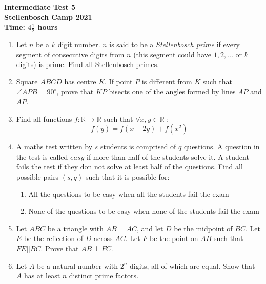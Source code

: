 \documentclass{article}
\begin{document}
\thispagestyle{empty}

\begin{center}
  \textbf{\Large Intermediate Test 5}
  \\ \vspace{1em}
  \textbf{\large Stellenbosch Camp 2021}
  \\ \vspace{1em}
  \textbf{\large Time: $4\frac{1}{2}$ hours}
\end{center}

\bigskip

\begin{enumerate}[itemsep=\fill]

\item %
Let $n$ be a $k$ digit number. $n$ is said to be a \textit{Stellenbosch prime} if every segment of consecutive digits from $n$ (this segment could have $1,2,...$ or $k$ digits) is prime. Find all Stellenbosch primes.


\item %
Square $ABCD$ has centre $K$. If point $P$ is different from $K$ such that $\angle APB = 90^{\circ}$, prove that $KP$ bisects one of the angles formed by lines $AP$ and $AP$.

\item %
Find all functions $f:\mathbb{R} \rightarrow \mathbb{R}$ such that $\forall x,y \in \mathbb{R}$ :
$$f(y) = f(x+2y) + f(x^2)$$

\item %
A maths test written by $s$ students is comprised of $q$ questions. A question in the test is called $easy$ if more than half of the students solve it. A student fails the test if they don not solve at least half of the questions. Find all possible pairs $(s, q)$ such that it is possible for:
\begin{enumerate}
\item All the questions to be easy when all the students fail the exam
\item None of the questions to be easy when none of the students fail the exam 
\end{enumerate}

\item %
Let $ABC$ be a triangle with $AB=AC$, and let $D$ be the midpoint of $BC$. Let $E$ be the reflection of $D$ across $AC$. Let $F$ be the point on $AB$ such that $FE||BC$. Prove that $AB\perp FC$.


\item %
Let $A$ be a natural number with $2^n$ digits, all of which are equal. Show that $A$ has at least $n$ distinct prime factors.

\end{enumerate}
\end{document}
